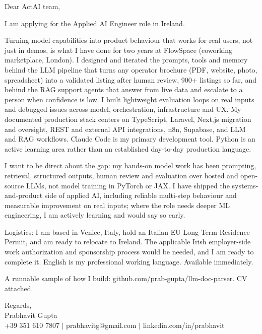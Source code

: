 \documentclass[a4paper,11pt]{article}
\begin{document}
Dear ActAI team,

I am applying for the Applied AI Engineer role in Ireland.

Turning model capabilities into product behaviour that works for real users, not just in demos, is what I have done for two years at FlowSpace (coworking marketplace, London). I designed and iterated the prompts, tools and memory behind the LLM pipeline that turns any operator brochure (PDF, website, photo, spreadsheet) into a validated listing after human review, 900+ listings so far, and behind the RAG support agents that answer from live data and escalate to a person when confidence is low. I built lightweight evaluation loops on real inputs and debugged issues across model, orchestration, infrastructure and UX. My documented production stack centers on TypeScript, Laravel, Next.js migration and oversight, REST and external API integrations, n8n, Supabase, and LLM and RAG workflows. Claude Code is my primary development tool. Python is an active learning area rather than an established day-to-day production language.

I want to be direct about the gap: my hands-on model work has been prompting, retrieval, structured outputs, human review and evaluation over hosted and open-source LLMs, not model training in PyTorch or JAX. I have shipped the systems-and-product side of applied AI, including reliable multi-step behaviour and measurable improvement on real inputs; where the role needs deeper ML engineering, I am actively learning and would say so early.

Logistics: I am based in Venice, Italy, hold an Italian EU Long Term Residence Permit, and am ready to relocate to Ireland. The applicable Irish employer-side work authorization and sponsorship process would be needed, and I am ready to complete it. English is my professional working language. Available immediately.

A runnable sample of how I build: github.com/prab-gupta/llm-doc-parser. CV attached.

Regards,\\
Prabhavit Gupta\\
+39 351 610 7807 $\vert$ prabhavitg@gmail.com $\vert$ linkedin.com/in/prabhavit
\end{document}
